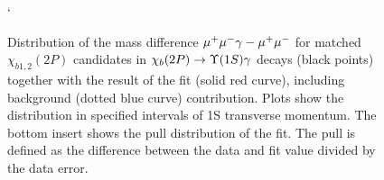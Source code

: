 \begin{figure}[H]
{\begin{picture}
  \end{picture}
  }
  \caption {\small 
    Distribution of the mass difference $\mumu \gamma - \mumu$ for matched
    $\chi_{b1,2}(2P)$ candidates in $\chibTwoP \to \Y1S \gamma$ decays
    (black points) together with the result of the fit (solid red curve),
    including background (dotted blue curve) contribution. Plots show the
    distribution in specified intervals of \Y1S transverse momentum. The bottom
    insert shows the  pull distribution of the fit. The pull is defined as the
    difference  between the data and fit value divided by the data error. }`
  \label{fig:mc:ups1s:fits2p}
\end{figure}



